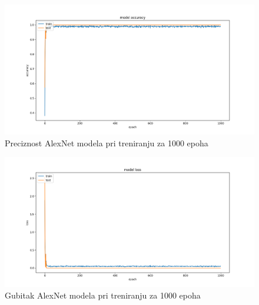 \documentclass[a4paper]{article}
\begin{document}
\begin{figure}[h!]
\begin{center}
\includegraphics[scale=0.27]{acc_1000_epoh_alexNet.png}
\end{center}
\caption{Preciznost AlexNet modela pri treniranju za 1000 epoha}
\label{fig:alex_acc_1000}
\end{figure}


\begin{figure}[h!]
\begin{center}
\includegraphics[scale=0.27]{loss_1000_epoh_alexNet.png}
\end{center}
\caption{Gubitak AlexNet modela pri treniranju za 1000 epoha}
\label{fig:alex_loss_1000}
\end{figure}
\end{document}
